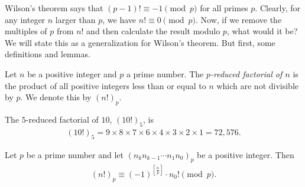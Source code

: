 \documentclass{subfile}
\begin{document}
Wilson's theorem says that $(p-1)! \equiv -1 \pmod p$ for all primes $p$. Clearly, for any integer $n$ larger than $p$, we have $n! \equiv 0 \pmod p$. Now, if we remove the multiples of $p$ from $n!$ and then calculate the result modulo $p$, what would it be? We will state this as a generalization for Wilson's theorem. But first, some definitions and lemmas.

	\begin{definition}
		Let $n$ be a positive integer and $p$ a prime number. The \textit{$p$-reduced factorial of $n$} is the product of all positive integers less than or equal to $n$ which are not divisible by $p$. We denote this by $(n!)_p$.
	\end{definition}
	
	\begin{example}
		The $5$-reduced factorial of $10$, $(10!)_5$, is
			\begin{align*}
				(10!)_5 = 9 \times 8 \times 7 \times 6 \times 4 \times 3 \times 2 \times 1 = 72,576.
			\end{align*}
	\end{example}
	
	
	\begin{theorem}\label{thm:reducedfactorialmodp}
		Let $p$ be a prime number and let $(n_k n_{k-1}\cdots n_1 n_0)_p$ be a positive integer. Then
			\begin{align*}
				(n!)_p\equiv (-1)^{\left[\frac{n}{p}\right]} \cdot n_0!\pmod p.
			\end{align*}
	\end{theorem}
	
\end{document}
